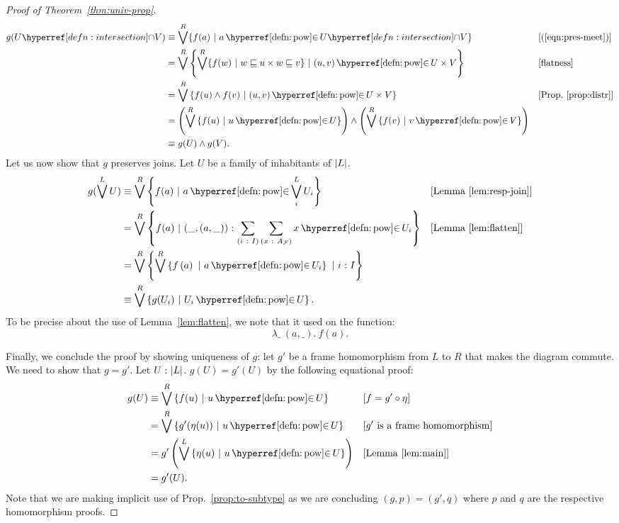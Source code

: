 \begin{proof}[Proof of Theorem~\ref{thm:univ-prop}]
  \begin{align*}
    g(\intersect{U}{V}) &\equiv \bigvee^R \{ f(a) ~|~ a \mempownm \intersect{U}{V} \}
               && [\text{(\ref{eqn:pres-meet})}] \\
             &= \bigvee^R \setof{ \bigvee^R \{ f(w) ~|~ w \sqsubseteq u \times w \sqsubseteq v \} ~|~ (u, v) \mempownm U \times V }
               && [\text{flatness}]                                                 \\
             &= \bigvee^R \setof{ f(u) \wedge f(v) ~|~ (u, v) \mempownm U \times V }
               &&\text{[Prop.~\ref{prop:distr}]}                                    \\
             &= \left( \bigvee^R \setof{ f(u) ~|~ u \mempownm U } \right)
              \wedge \left( \bigvee^R \setof{ f(v) ~|~ v \mempownm V } \right)                 \\
             &\equiv g(U) \wedge g(V)                                                         .
  \end{align*}
  Let us now show that $g$ preserves joins. Let $U$ be a family of inhabitants of
  $\left| L \right|$.
  \begin{align*}
    g(\bigvee^L U) &\equiv \bigvee^R \setof{ f(a) ~|~ a \mempownm \bigvee^L_i U_i }
                && [\text{Lemma~\ref{lem:resp-join}}]\\
    &= \bigvee^R \setof{ f(a) ~|~ \oftyI{(\_, (a, \_))}{\sigmaty{i}{I}{\sigmaty{x}{A_{\McF{}}}{x \mempownm U_i}}} }
                && [\text{Lemma~\ref{lem:flatten}}] \\
             &= \bigvee^R \setof{ \bigvee^R \img{f}{U_i} ~|~ \oftyI{i}{I} } \\
             &\equiv \bigvee^R \setof{ g(U_i) ~|~ U_i \mempownm U }.
  \end{align*}
  To be precise about the use of Lemma~\ref{lem:flatten}, we note that it used on the
  function:
  \begin{equation*}
    \lambda\_~(a, \_).~f(a).
  \end{equation*}

  Finally, we conclude the proof by showing uniqueness of $g$: let $g'$ be a frame
  homomorphism from $L$ to $R$ that makes the diagram commute. We need to show that
  $g = g'$. Let $U\hspace{0.1mm}:\hspace{0.1mm}\left| L \right|$. $g(U) = g'(U)$ by the following equational proof:
  \begin{align*}
    g(U) &\equiv \bigvee^R \setof{ f(u) ~|~ u \mempownm U }
            &&\text{[$f = g' \circ \eta$]} \\
         &= \bigvee^R \setof{ g'(\eta(u)) ~|~ u \mempownm U }
            &&\text{[$g'$ is a frame homomorphism]} \\
         &= g'\left( \bigvee^L \setof{ \eta(u) ~|~ u \mempownm U } \right)
            &&\text{[Lemma~\ref{lem:main}]} \\
         &= g'(U).
  \end{align*}
  Note that we are making implicit use of Prop.~\ref{prop:to-subtype} as we are concluding
  $(g, p) = (g' , q)$ where $p$ and $q$ are the respective homomorphism proofs.
\end{proof}
